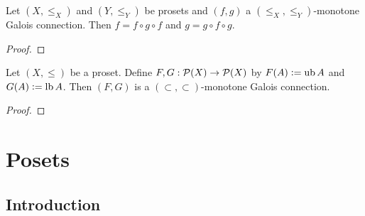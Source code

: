 \documentclass{book}
\begin{document}
	\begin{ex}
		Let $(X, \leq_X)$ and $(Y, \leq_Y)$ be prosets and $(f,g)$ a $(\leq_X, \leq_Y)$-monotone Galois connection. Then $f = f \circ g \circ f$ and $g = g \circ f \circ g$.
	\end{ex}
	
	\begin{proof}
	\end{proof}
	
	\begin{ex}
		Let $(X, \leq)$ be a proset. Define $F,G: \mathcal{P}(X) \rightarrow \mathcal{P}(X)$ by $F(A) \vcentcolon= \operatorname{ub} A$ and $G(A) \vcentcolon= \operatorname{lb} A$. Then $(F,G)$ is a $(\subset, \subset)$-monotone Galois connection. 
	\end{ex}
	
	\begin{proof}
	\end{proof}
	
	
	
	
	
	
	
	
	
	
	
	
	
	
	
	
	
	
	
	
	
	
	
	
	
	
	
	
	
	
	
	
	
	
	
	
	
	
	
	
	
	
	
	
	
	
	
	\newpage
	\section{Posets}
	
	\subsection{Introduction}
	
\end{document}
